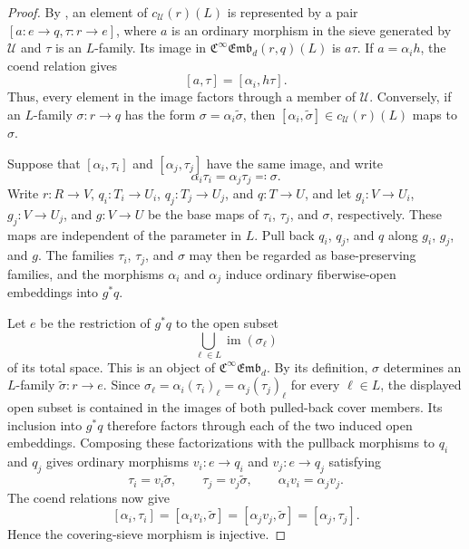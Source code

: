 \documentclass{amsart}
\newcommand{\femb}[1]{\mathfrak{C}^{\infty}\mathfrak{Emb}_{#1}}
\theoremstyle{definition}
\numberwithin{equation}{subsection}
\numberwithin{subsubsection}{subsection}
\begin{document}
\begin{proof}
  By , an element of
  \(c_{\mathcal{U}}(r)(L)\) is represented by a pair
  \([a:e\to q,\tau:r\to e]\), where \(a\) is an ordinary morphism in
  the sieve generated by \(\mathcal{U}\) and \(\tau\) is an \(L\)-family.
  Its image in \(\femb{d}(r,q)(L)\) is \(a\tau\). If \(a=\alpha_i h\), the
  coend relation gives
  \[
    [a,\tau]=[\alpha_i,h\tau].
  \]
  Thus, every element in the image factors through a member of
  \(\mathcal{U}\). Conversely, if an \(L\)-family
  \(\sigma:r\to q\) has the form
  \(\sigma=\alpha_i\widetilde\sigma\), then
  \([\alpha_i,\widetilde\sigma]\in c_{\mathcal{U}}(r)(L)\) maps to
  \(\sigma\).

  Suppose that \([\alpha_i,\tau_i]\) and \([\alpha_j,\tau_j]\) have the same
  image,
  and write
  \[
    \alpha_i\tau_i=\alpha_j\tau_j\eqqcolon\sigma.
  \]
  Write \(r:R\to V\), \(q_i:T_i\to U_i\),
  \(q_j:T_j\to U_j\), and \(q:T\to U\), and let \(g_i:V\to U_i\),
  \(g_j:V\to U_j\), and \(g:V\to U\) be the base maps of
  \(\tau_i\), \(\tau_j\), and \(\sigma\), respectively. These maps are
  independent of the parameter in \(L\). Pull back \(q_i\), \(q_j\),
  and \(q\) along \(g_i\), \(g_j\), and \(g\). The families
  \(\tau_i\), \(\tau_j\), and \(\sigma\) may then be regarded as
  base-preserving families, and the morphisms \(\alpha_i\) and \(\alpha_j\)
  induce ordinary fiberwise-open embeddings into \(g^*q\).

  Let \(e\) be the restriction of \(g^*q\) to the open subset
  \[
    \bigcup_{\ell\in L}\operatorname{im}(\sigma_\ell)
  \]
  of its total space. This is an object of \(\femb{d}\). By its
  definition, \(\sigma\) determines an \(L\)-family
  \(\widetilde\sigma:r\to e\). Since
  \(\sigma_\ell=\alpha_i(\tau_i)_\ell=\alpha_j(\tau_j)_\ell\) for every
  \(\ell\in L\), the displayed open subset is contained in the images
  of both pulled-back cover members. Its inclusion into \(g^*q\)
  therefore factors through each of the two induced open embeddings.
  Composing these factorizations with the pullback morphisms to
  \(q_i\) and \(q_j\) gives ordinary morphisms
  \(v_i:e\to q_i\) and \(v_j:e\to q_j\) satisfying
  \[
    \tau_i=v_i\widetilde\sigma,
    \qquad
    \tau_j=v_j\widetilde\sigma,
    \qquad
    \alpha_iv_i=\alpha_jv_j.
  \]
  The coend relations now give
  \[
    [\alpha_i,\tau_i]
    =[\alpha_iv_i,\widetilde\sigma]
    =[\alpha_jv_j,\widetilde\sigma]
    =[\alpha_j,\tau_j].
  \]
  Hence the covering-sieve morphism is injective.
\end{proof}
\end{document}

